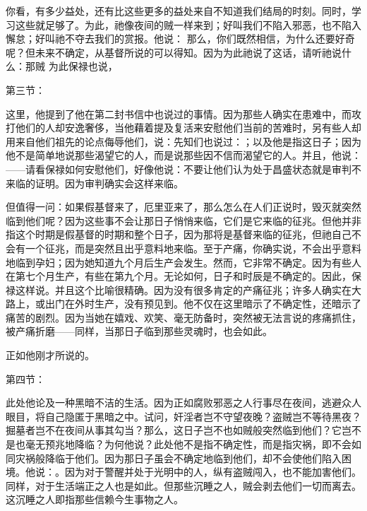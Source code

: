 你看，有多少益处，还有比这些更多的益处来自不知道我们结局的时刻。同时，学习这些就足够了。为此，祂像夜间的贼一样来到；好叫我们不陷入邪恶，也不陷入懈怠；好叫祂不夺去我们的赏报。他说： 那么，你们既然相信，为什么还要好奇呢？但未来不确定，从基督所说的可以得知。因为为此祂说了这话，请听祂说什么：那贼 为此保禄也说，\par

第三节：\par

这里，他提到了他在第二封书信中也说过的事情。因为那些人确实在患难中，而攻打他们的人却安逸奢侈，当他藉着提及复活来安慰他们当前的苦难时，另有些人却用来自他们祖先的论点侮辱他们，说：先知们也说过：；以及他是指这日子；因为他不是简单地说那些渴望它的人，而是说那些因不信而渴望它的人。并且，他说：——请看保禄如何安慰他们，好像他说：不要让他们认为处于昌盛状态就是审判不来临的证明。因为审判确实会这样来临。\par

但值得一问：如果假基督来了，厄里亚来了，那么怎么在人们正说时，毁灭就突然临到他们呢？因为这些事不会让那日子悄悄来临，它们是它来临的征兆。但他并非指这个时期是假基督的时期和整个日子，因为那将是基督来临的征兆，但祂自己不会有一个征兆，而是突然且出乎意料地来临。至于产痛，你确实说，不会出乎意料地临到孕妇；因为她知道九个月后生产会发生。然而，它非常不确定。因为有些人在第七个月生产，有些在第九个月。无论如何，日子和时辰是不确定的。因此，保禄这样说。并且这个比喻很精确。因为没有很多肯定的产痛征兆；许多人确实在大路上，或出门在外时生产，没有预见到。他不仅在这里暗示了不确定性，还暗示了痛苦的剧烈。因为当她在嬉戏、欢笑、毫无防备时，突然被无法言说的疼痛抓住，被产痛折磨——同样，当那日子临到那些灵魂时，也会如此。\par

 正如他刚才所说的。\par

第四节：\par

此处他论及一种黑暗不洁的生活。因为正如腐败邪恶之人行事尽在夜间，逃避众人眼目，将自己隐匿于黑暗之中。试问，奸淫者岂不守望夜晚？盗贼岂不等待黑夜？掘墓者岂不在夜间从事其勾当？那么，这日子岂不也如贼般突然临到他们？它岂不是也毫无预兆地降临？为何他说？此处他不是指不确定性，而是指灾祸，即不会如同灾祸般降临于他们。因为那日子虽会不确定地临到他们，却不会使他们陷入困境。他说：。因为对于警醒并处于光明中的人，纵有盗贼闯入，也不能加害他们。同样，对于生活端正之人也是如此。但那些沉睡之人，贼会剥去他们一切而离去。这沉睡之人即指那些信赖今生事物之人。\par


